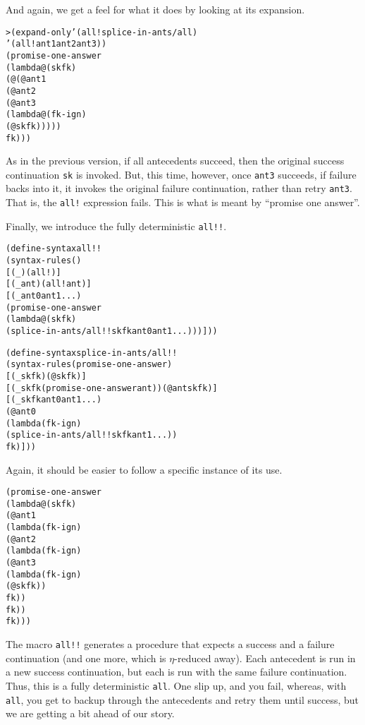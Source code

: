 \noindent
And again, we get a feel for what it does by looking at its
expansion.

\begin{alltt}
> (expand-only '(all! splice-in-ants/all)
    '(all! ant1 ant2 ant3))
(promise-one-answer
  (lambda@ (sk fk)
    (@ (@ ant1
         (@ ant2
           (@ ant3
             (lambda@ (fk-ign)
               (@ sk fk)))))
       fk)))
\end{alltt}

As in the previous version, if all antecedents succeed, then the
original success continuation \texttt{sk} is invoked.  But, this time,
however, once \texttt{ant3} succeeds, if failure backs into it, it
invokes the original failure continuation, rather than retry
\texttt{ant3}.  That is, the \texttt{all!} expression fails. This is
what is meant by ``promise one answer''.

Finally, we introduce the fully deterministic \texttt{all!!}.

\begin{alltt}
(define-syntax all!!
  (syntax-rules ()
    [(_) (all!)]
    [(_ ant) (all! ant)]
    [(_ ant0 ant1 ...)
     (promise-one-answer
       (lambda@ (sk fk)
         (splice-in-ants/all!! sk fk ant0 ant1 ...)))]))

(define-syntax splice-in-ants/all!!
  (syntax-rules (promise-one-answer)
    [(_ sk fk) (@ sk fk)]
    [(_ sk fk (promise-one-answer ant)) (@ ant sk fk)]
    [(_ sk fk ant0 ant1 ...)
     (@ ant0
       (lambda (fk-ign)
         (splice-in-ants/all!! sk fk ant1 ...))
       fk)]))
\end{alltt}

Again, it should be easier to follow a specific instance of its use.

\begin{alltt}
(promise-one-answer
  (lambda@ (sk fk)
    (@ ant1
      (lambda (fk-ign)
        (@ ant2
          (lambda (fk-ign)
            (@ ant3
              (lambda (fk-ign)
                (@ sk fk))
              fk))
          fk))
      fk)))
\end{alltt}

The macro \texttt{all!!} generates a procedure that expects a success
and a failure continuation (and one more, which is $\eta$-reduced
away).  Each antecedent is run in a new success continuation, but each
is run with the same failure continuation.  Thus, this is a fully
deterministic \texttt{all}.  One slip up, and you fail, whereas, with
\texttt{all}, you get to backup through the antecedents and retry them
until success, but we are getting a bit ahead of our story.


